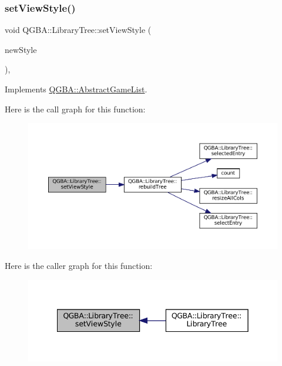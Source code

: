 \subsubsection{\texorpdfstring{set\+View\+Style()}{setViewStyle()}}
{\footnotesize\ttfamily void Q\+G\+B\+A\+::\+Library\+Tree\+::set\+View\+Style (\begin{DoxyParamCaption}\item[{\mbox{\hyperlink{namespace_q_g_b_a_a4804d48d02699a2c1d2436e9269a8bb8}{Library\+Style}}}]{new\+Style }\end{DoxyParamCaption})\hspace{0.3cm}{\ttfamily [override]}, {\ttfamily [virtual]}}



Implements \mbox{\hyperlink{class_q_g_b_a_1_1_abstract_game_list_af2f88dba7da390c2d89a362bafc5a6e4}{Q\+G\+B\+A\+::\+Abstract\+Game\+List}}.

Here is the call graph for this function\+:
\nopagebreak
\begin{figure}[H]
\begin{center}
\leavevmode
\includegraphics[width=350pt]{class_q_g_b_a_1_1_library_tree_a2782544a4651fbf6529cd495ec980d9a_cgraph}
\end{center}
\end{figure}
Here is the caller graph for this function\+:
\nopagebreak
\begin{figure}[H]
\begin{center}
\leavevmode
\includegraphics[width=342pt]{class_q_g_b_a_1_1_library_tree_a2782544a4651fbf6529cd495ec980d9a_icgraph}
\end{center}
\end{figure}
\mbox{\label{class_q_g_b_a_1_1_library_tree_ad626b8a7235cd5e88876391a85d0ca3f}} 
